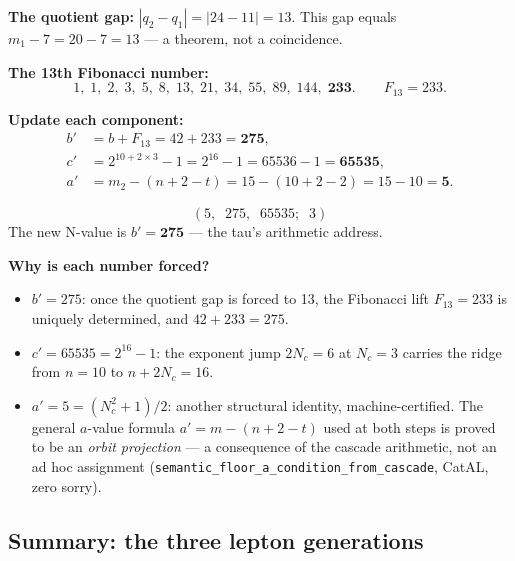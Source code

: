 \documentclass[11pt,a4paper]{article}
\newcommand{\lean}[1]{\texttt{#1}}
\newcommand{\Nc}{N_c}
\newcommand{\CatAL}{\textsf{CatAL}}
\begin{document}
\medskip
\textbf{The quotient gap:} $|q_2 - q_1| = |24 - 11| = 13$.  This gap equals
$m_1 - 7 = 20 - 7 = 13$ --- a theorem, not a coincidence.

\textbf{The 13th Fibonacci number:}
\[
  1,\;1,\;2,\;3,\;5,\;8,\;13,\;21,\;34,\;55,\;89,\;144,\;\mathbf{233}.
  \qquad F_{13} = 233.
\]

\textbf{Update each component:}
\begin{align*}
  b' &= b + F_{13} = 42 + 233 = \mathbf{275}, \\[4pt]
  c' &= 2^{10 + 2 \times 3} - 1 = 2^{16} - 1 = 65536 - 1 = \mathbf{65535}, \\[4pt]
  a' &= m_2 - (n + 2 - t) = 15 - (10 + 2 - 2) = 15 - 10 = \mathbf{5}.
\end{align*}

\begin{tcolorbox}[colback=boxgreen,colframe=green!50!black,title=Result: Tau triple]
\[
  (5,\;\;275,\;\;65535;\;\;3)
\]
The new N-value is $b' = \mathbf{275}$ --- the tau's arithmetic address.
\end{tcolorbox}

\noindent\textbf{Why is each number forced?}
\begin{itemize}[itemsep=2pt]
  \item $b' = 275$: once the quotient gap is forced to 13, the Fibonacci lift
    $F_{13} = 233$ is uniquely determined, and $42 + 233 = 275$.
  \item $c' = 65535 = 2^{16} - 1$: the exponent jump $2\Nc = 6$ at $\Nc = 3$
    carries the ridge from $n = 10$ to $n + 2\Nc = 16$.
  \item $a' = 5 = (\Nc^2 + 1)/2$: another structural identity, machine-certified.
    The general $a$-value formula $a' = m - (n + 2 - t)$ used at both steps is
    proved to be an \emph{orbit projection} — a consequence of the cascade
    arithmetic, not an ad hoc assignment
    (\lean{semantic\_floor\_a\_condition\_from\_cascade}, \CatAL, zero sorry).
\end{itemize}

\subsection{Summary: the three lepton generations}
\end{document}
